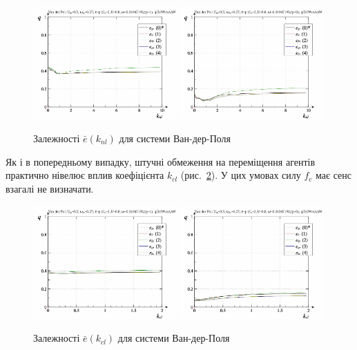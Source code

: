 \begin{figure}[ht!]
\begin{center}
  \includegraphics[width=0.49\textwidth]{p/cha/vdp/vdp_id-p_k_nl_sign.png}
  \hfill
  \includegraphics[width=0.49\textwidth]{p/cha/vdp/vdp_id-p_k_nl_sin.png}
\end{center}
  \caption{Залежності $\bar{e}(k_{nl})$ для системи Ван-дер-Поля}
\label{atu:f:vdp_e_k_nl}
\end{figure}

Як і в попередньому випадку, штучні обмеження на переміщення
агентів практично нівелює вплив коефіцієнта
$ k_{cl} $ (рис.~\ref{atu:f:vdp_e_k_cl}). У цих умовах силу
$ f_c $ має сенс взагалі не визначати.

\begin{figure}[ht!]
\begin{center}
  \includegraphics[width=0.49\textwidth]{p/cha/vdp/vdp_id-p_k_cl_sign.png}
  \hfill
  \includegraphics[width=0.49\textwidth]{p/cha/vdp/vdp_id-p_k_cl_sin.png}
\end{center}
  \caption{Залежності $\bar{e}(k_{cl})$ для системи Ван-дер-Поля}
\label{atu:f:vdp_e_k_cl}
\end{figure}

